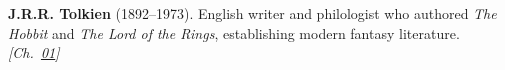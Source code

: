\textbf{J.R.R. Tolkien} (1892–1973). English writer and philologist who authored \emph{The Hobbit} and \emph{The Lord of the Rings}, establishing modern fantasy literature. \emph{[Ch.~\hyperref[ch:goldrelativity]{01}]}

